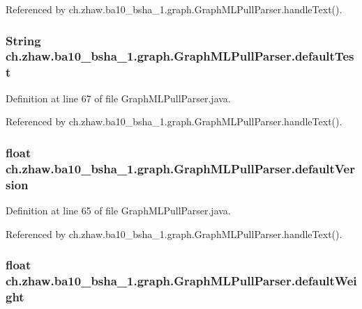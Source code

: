 Referenced by ch.zhaw.ba10\_\-bsha\_\-1.graph.GraphMLPullParser.handleText().\hypertarget{classch_1_1zhaw_1_1ba10__bsha__1_1_1graph_1_1GraphMLPullParser_a9ffb54d99e75b7486ff62d5c81a02f0d}{
\subsubsection[{defaultTest}]{\setlength{\rightskip}{0pt plus 5cm}String {\bf ch.zhaw.ba10\_\-bsha\_\-1.graph.GraphMLPullParser.defaultTest}}}
\label{classch_1_1zhaw_1_1ba10__bsha__1_1_1graph_1_1GraphMLPullParser_a9ffb54d99e75b7486ff62d5c81a02f0d}


Definition at line 67 of file GraphMLPullParser.java.

Referenced by ch.zhaw.ba10\_\-bsha\_\-1.graph.GraphMLPullParser.handleText().\hypertarget{classch_1_1zhaw_1_1ba10__bsha__1_1_1graph_1_1GraphMLPullParser_a358171c0cc9e1c06de938c842793aa0c}{
\subsubsection[{defaultVersion}]{\setlength{\rightskip}{0pt plus 5cm}float {\bf ch.zhaw.ba10\_\-bsha\_\-1.graph.GraphMLPullParser.defaultVersion}}}
\label{classch_1_1zhaw_1_1ba10__bsha__1_1_1graph_1_1GraphMLPullParser_a358171c0cc9e1c06de938c842793aa0c}


Definition at line 65 of file GraphMLPullParser.java.

Referenced by ch.zhaw.ba10\_\-bsha\_\-1.graph.GraphMLPullParser.handleText().\hypertarget{classch_1_1zhaw_1_1ba10__bsha__1_1_1graph_1_1GraphMLPullParser_ad92f2d9a4a9f758ebac8b19b650f0759}{
\subsubsection[{defaultWeight}]{\setlength{\rightskip}{0pt plus 5cm}float {\bf ch.zhaw.ba10\_\-bsha\_\-1.graph.GraphMLPullParser.defaultWeight}}}
\label{classch_1_1zhaw_1_1ba10__bsha__1_1_1graph_1_1GraphMLPullParser_ad92f2d9a4a9f758ebac8b19b650f0759}


